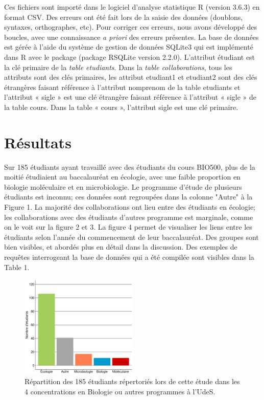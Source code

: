 \documentclass[letterpaper,twocolumn,showkeys, 12pt]{article}
\begin{document}
Ces fichiers sont importé dans le logiciel d’analyse statistique R (version 3.6.3) en format CSV. Des erreurs ont été fait lors de la saisie des données (doublons, syntaxes, orthographes, etc). Pour corriger ces erreurs, nous avons développé des boucles, avec une connaissance \textit{a priori} des erreurs présentes. La base de données est gérée à l’aide du système de gestion de données SQLite3 qui est implémenté dans R avec le package (package RSQLite version 2.2.0). L’attribut étudiant est la clé primaire de la \textit{table etudiants}. Dans la \textit{table collaborations}, tous les attributs sont des clés primaires, les attribut  etudiant1  et  etudiant2  sont des clés étrangères faisant référence à l’attribut  nomprenom  de la table  etudiants  et l’attribut « sigle » est une clé étrangère faisant référence à l’attribut « sigle » de la table  cours. Dans la table « cours », l’attribut  sigle  est une clé primaire. 

\section*{Résultats}

Sur 185 étudiants ayant travaillé avec des étudiants du cours BIO500, plus de la moitié étudiaient au baccalauréat en écologie, avec une faible proportion en biologie moléculaire et en microbiologie. Le programme d'étude de plusieurs étudiants est inconnu; ces données sont regroupées dans la colonne "Autre" à la Figure 1. La majorité des collaborations ont lieu entre des étudiants en écologie; les collaborations avec des étudiants d'autres programme est marginale, comme on le voit sur la figure 2 et 3. La figure 4 permet de visualiser les liens entre les étudiants selon l'année du commencement de leur baccalauréat. Des groupes sont bien visibles, et abordés plus en détail dans la discussion. Des exemples de requêtes interrogeant la base de données qui a été compilée sont visibles dans la Table 1.


\begin{figure}[h]
    \centering
    \includegraphics[width=0.5\textwidth]{Figure 1.pdf}
    \caption{Répartition des 185 étudiants répertoriés lors de cette étude dans les 4 concentrations en Biologie ou autres programmes à l'UdeS.}
    \label{fig:barplot1}
\end{figure}
\end{document}
